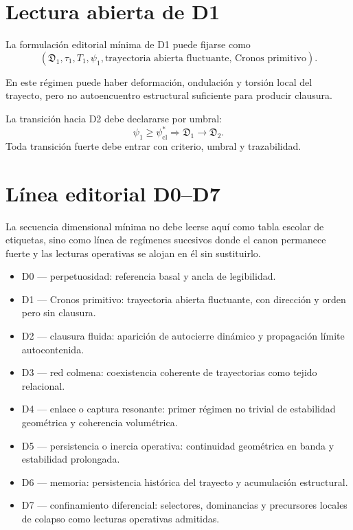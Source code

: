 \section{Lectura abierta de D1}
\begin{definition}
La formulación editorial mínima de D1 puede fijarse como
\[
(\mathfrak{D}_1,\tau_1,T_1,\psi_1,\text{trayectoria abierta fluctuante, Cronos primitivo}).
\]
\end{definition}

\begin{observation}
En este régimen puede haber deformación, ondulación y torsión local del trayecto, pero no autoencuentro estructural suficiente para producir clausura.
\end{observation}

\begin{observation}
La transición hacia D2 debe declararse por umbral:
\[
\psi_1 \ge \psi^\ast_{\mathrm{cl}} \Longrightarrow \mathfrak{D}_1 \to \mathfrak{D}_2.
\]
Toda transición fuerte debe entrar con criterio, umbral y trazabilidad.
\end{observation}

\section{Línea editorial D0--D7}
\begin{observation}
La secuencia dimensional mínima no debe leerse aquí como tabla escolar de etiquetas, sino como línea de regímenes sucesivos donde el canon permanece fuerte y las lecturas operativas se alojan en él sin sustituirlo.
\end{observation}

\begin{itemize}
\item D0 --- perpetuosidad: referencia basal y ancla de legibilidad.
\item D1 --- Cronos primitivo: trayectoria abierta fluctuante, con dirección y orden pero sin clausura.
\item D2 --- clausura fluida: aparición de autocierre dinámico y propagación límite autocontenida.
\item D3 --- red colmena: coexistencia coherente de trayectorias como tejido relacional.
\item D4 --- enlace o captura resonante: primer régimen no trivial de estabilidad geométrica y coherencia volumétrica.
\item D5 --- persistencia o inercia operativa: continuidad geométrica en banda y estabilidad prolongada.
\item D6 --- memoria: persistencia histórica del trayecto y acumulación estructural.
\item D7 --- confinamiento diferencial: selectores, dominancias y precursores locales de colapso como lecturas operativas admitidas.
\end{itemize}

